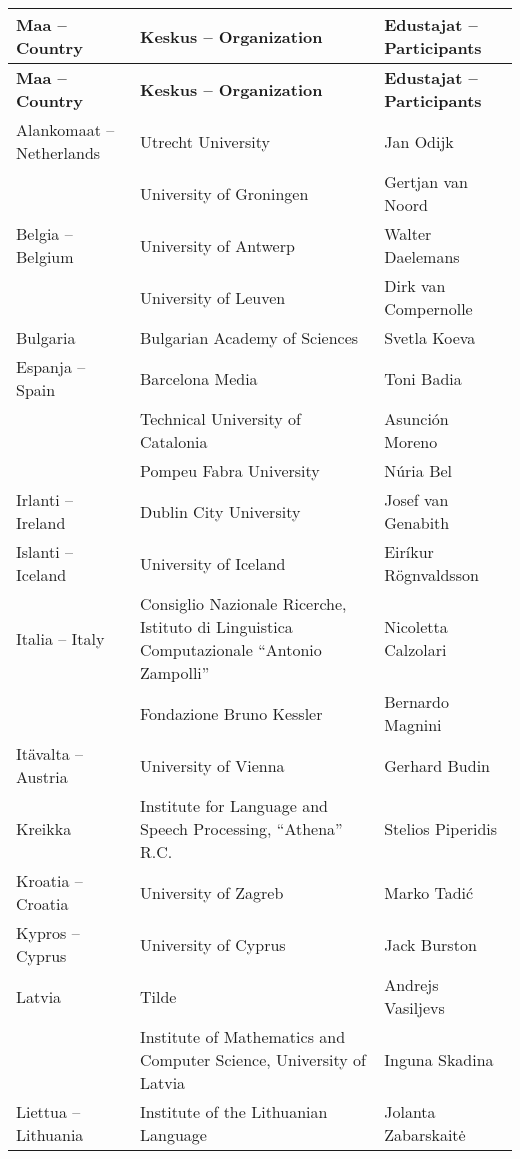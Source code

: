 \documentclass[]{../../metanetpaper}
\begin{document}
\begin{Parallel}[c]{70mm}{70mm}
\begin{longtable}{p{3.5cm}|p{5.5cm}|p{5cm}}
 \hline \textbf{Maa -- Country}
 & \textbf{Keskus -- Organization}
 & \textbf{Edustajat -- Participants}
 \\ \hline \endfirsthead
 \hline \textbf{Maa -- Country}
 & \raggedright \textbf{Keskus -- Organization}
 & \textbf{Edustajat -- Participants}
 \\ \hline \endhead
 Alankomaat -- Netherlands
 &  Utrecht University
 &  Jan Odijk
 \\
 &  University of Groningen
 &  Gertjan van Noord
 \\ \hline
 Belgia -- Belgium
 &  University of Antwerp
 &  Walter Daelemans
 \\
 &  University of Leuven
 &  Dirk van Compernolle
 \\ \hline
 Bulgaria
 &  Bulgarian Academy of Sciences
 &  Svetla Koeva
 \\ \hline
 Espanja -- Spain
 &  Barcelona Media
 &  Toni Badia
 \\
 &  Technical University of Catalonia
 &  Asunción Moreno
 \\
 &  Pompeu Fabra University
 &  Núria Bel
 \\ \hline
 Irlanti -- Ireland
 &  Dublin City University
 & Josef van Genabith
 \\ \hline
 Islanti -- Iceland
 &  University of Iceland
 &  Eiríkur Rögnvaldsson
 \\ \hline
 Italia -- Italy
 &  Consiglio Nazionale Ricerche,
    Istituto di Linguistica
    Computazionale “Antonio
    Zampolli”
 &  Nicoletta Calzolari
 \\
 &  Fondazione Bruno Kessler
 &  Bernardo Magnini
 \\ \hline
 Itävalta -- Austria
 &  University of Vienna
 &  Gerhard Budin
 \\ \hline
 Kreikka
 &  Institute for Language and        
    Speech Processing, “Athena” R.C.
 & Stelios Piperidis
 \\ \hline
 Kroatia -- Croatia
 &  University of Zagreb
 &  Marko Tadić
 \\ \hline
 Kypros -- Cyprus
 &  University of Cyprus
 &  Jack Burston
 \\ \hline
 Latvia
 &  Tilde
 &  Andrejs Vasiljevs
 \\
 &  Institute of Mathematics and      
    Computer Science, University of  
    Latvia
 &  Inguna Skadina
 \\ \hline
 Liettua -- Lithuania
 &  Institute of the Lithuanian       
    Language
 &  Jolanta Zabarskaitė

\end{longtable}
\end{Parallel}
\end{document}
